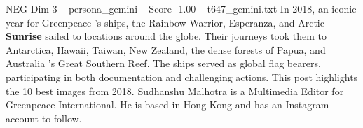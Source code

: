 \begin{textsample}{NEG Dim 3 – persona\_gemini – Score -1.00 – t647\_gemini.txt}  \label{ex:f3_neg_015}
In 2018, an iconic year for Greenpeace ’s ships, the Rainbow Warrior, Esperanza, and Arctic \textbf{Sunrise} sailed to locations around the globe.
Their journeys took them to Antarctica, Hawaii, Taiwan, New Zealand, the dense forests of Papua, and Australia 's Great Southern Reef.
The ships served as global flag bearers, participating in both documentation and challenging actions.
This post highlights the 10 best images from 2018.
Sudhanshu Malhotra is a Multimedia Editor for Greenpeace International.
He is based in Hong Kong and has an Instagram account to follow.

\end{textsample}
